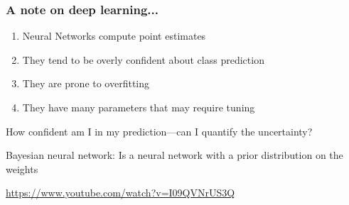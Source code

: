 \documentclass[table,dvipsnames]{beamer}
\newcommand{\keywd}{\textcolor{myorange}}
\begin{document}
\begin{frame}[fragile]
\frametitle{A note on deep learning...}
\begin{enumerate}
 \item Neural Networks compute point estimates
 \item They tend to be overly confident about class prediction
 \item They are prone to overfitting
 \item They have many parameters that may require tuning
\end{enumerate}

\begin{block}{}
 How confident am I in my prediction---can I quantify the uncertainty?
\end{block}

\keywd{Bayesian neural network}: Is a neural network with a prior distribution on the weights

\tiny
\href{https://www.youtube.com/watch?v=I09QVNrUS3Q}{https://www.youtube.com/watch?v=I09QVNrUS3Q}
\citep{Tran17}
\end{frame}

\end{document}
